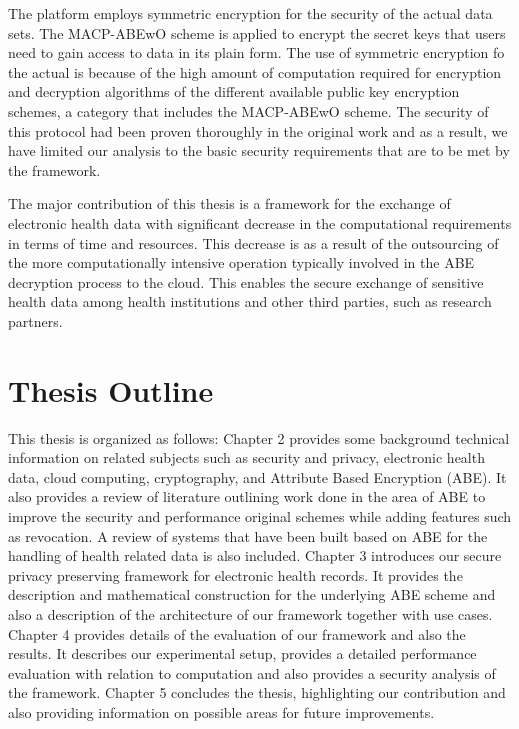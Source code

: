 The platform employs symmetric encryption for the security of the actual data sets. The MACP-ABEwO scheme is applied to encrypt the secret keys that users need to gain access to data in its plain form. The use of symmetric encryption fo the actual is because of the high amount of computation required for encryption and decryption algorithms of the different available public key encryption schemes, a category that includes the MACP-ABEwO scheme. The security of this protocol had been proven thoroughly in the original work \cite{Yang2014} and as a result, we have limited our analysis to the basic security requirements that are to be met by the framework.

The major contribution of this thesis is a framework for the exchange of electronic health data with significant decrease in the computational requirements in terms of time and resources. This decrease is as a result of the outsourcing of the more computationally intensive operation typically involved in the ABE decryption process to the cloud. This enables the secure exchange of sensitive health data among health institutions and other third parties, such as research partners.


\section{Thesis Outline}

This thesis is organized as follows: Chapter 2 provides some background technical information on related subjects such as security and privacy, electronic health data, cloud computing, cryptography, and Attribute Based Encryption (ABE). It also provides a review of literature outlining work done in the area of ABE to improve the security and performance original schemes while adding features such as revocation. A review of systems that have been built based on ABE for the handling of health related data is also included. Chapter 3 introduces our secure privacy preserving framework for electronic health records. It provides the description and mathematical construction for the underlying ABE scheme and also a description of the architecture of our framework together with use cases. Chapter 4 provides details of the evaluation of our framework and also the results. It describes our experimental setup, provides a detailed performance evaluation with relation to computation and also provides a security analysis of the framework. Chapter 5 concludes the thesis, highlighting our contribution and also providing information on possible areas for future improvements.